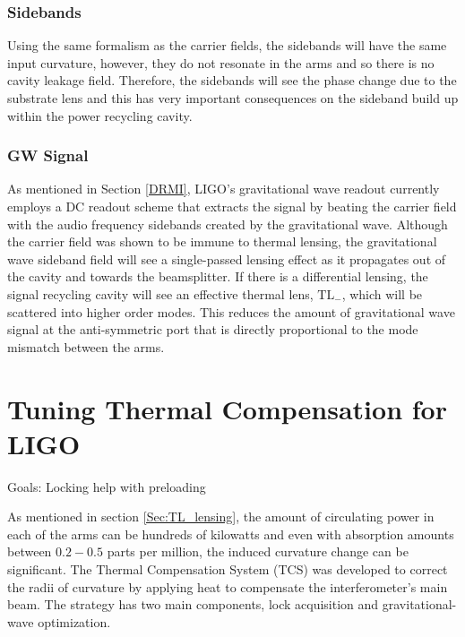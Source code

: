 		\subsubsection{Sidebands}
		Using the same formalism as the carrier fields, the sidebands will have the same input curvature, however, they do not resonate in the arms and so there is no cavity leakage field.  Therefore, the sidebands will see the phase change due to the substrate lens and this has very important consequences on the sideband build up within the power recycling cavity.
		
		\subsubsection{GW Signal}
		As mentioned in Section \ref{DRMI}, LIGO's gravitational wave readout currently employs a DC readout scheme that extracts the signal by beating the carrier field with the audio frequency sidebands created by the gravitational wave.  Although the carrier field was shown to be immune to thermal lensing, the gravitational wave sideband field will see a single-passed lensing effect as it propagates out of the cavity and towards the beamsplitter.  If there is a differential lensing, the signal recycling cavity will see an effective thermal lens, $\text{TL}_{-}$, which will be scattered into higher order modes.  This reduces the amount of gravitational wave signal at the anti-symmetric port that is directly proportional to the mode mismatch between the arms.
	
	\section{Tuning Thermal Compensation for LIGO}
	Goals: Locking help with preloading
	
	\cite{Lawrence_TCS}
	
	\cite{AWC_current}
	
	\cite{Strain_TL}
	
	\cite{Vinet_Thermal_Issues}
	
	As mentioned in section \ref{Sec:TL_lensing}, the amount of circulating power in each of the arms can be hundreds of kilowatts and even with absorption amounts between $0.2-0.5$ parts per million, the induced curvature change can be significant.  The Thermal Compensation System (TCS) was developed to correct the radii of curvature by applying heat to compensate the interferometer's main beam.  The strategy has two main components, lock acquisition and gravitational-wave optimization.
	
